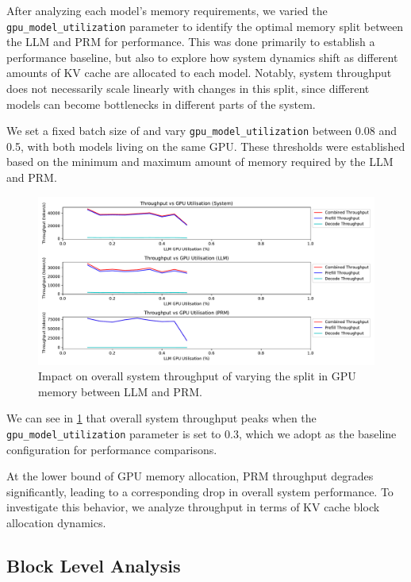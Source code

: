 \documentclass[11pt,twoside]{report}
\begin{document}
After analyzing each model's memory requirements, we varied the \texttt{gpu\_model\_utilization} parameter to identify the optimal memory split between the LLM and PRM for performance. 
This was done primarily to establish a performance baseline, but also to explore how system dynamics shift as different amounts of KV cache are allocated to each model. 
Notably, system throughput does not necessarily scale linearly with changes in this split, since different models can become bottlenecks in different parts of the system.

We set a fixed batch size of and vary \texttt{gpu\_model\_utilization} between 0.08 and 0.5, with both models living on the same GPU.
These thresholds were established based on the minimum and maximum amount of memory required by the LLM and PRM.

\begin{figure}[htbp]
  \centering
  \includegraphics[width=\textwidth]{figures/system_throughput_gpu_utilisation.pdf}
  \caption{Impact on overall system throughput of varying the split in GPU memory between LLM and PRM.}
  \label{fig:system_throughput_gpu_utilisation}
\end{figure}

We can see in \ref{fig:system_throughput_gpu_utilisation} that overall system throughput peaks when the \texttt{gpu\_model\_utilization} parameter is set to 0.3, which we adopt as the baseline configuration for performance comparisons.

At the lower bound of GPU memory allocation, PRM throughput degrades significantly, leading to a corresponding drop in overall system performance. 
To investigate this behavior, we analyze throughput in terms of KV cache block allocation dynamics.

\subsection{Block Level Analysis}
\end{document}
